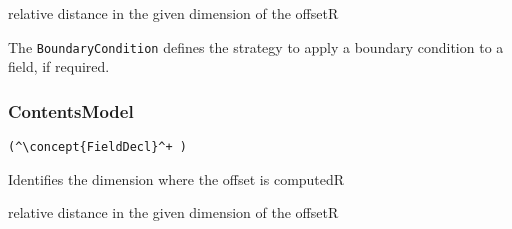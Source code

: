 \begin{HIRAttributes}
	{relative distance in the given dimension of the offset}{R}
\end{HIRAttributes}

The {\tt BoundaryCondition} defines the strategy to apply a boundary condition to a field, if required.

\subsubsection*{ContentsModel}{}

\begin{lstlisting}[style=default]
(^\concept{FieldDecl}^+ )
\end{lstlisting}

\begin{HIRChildElements}
	{Identifies the dimension where the offset is computed}{R}
\end{HIRChildElements}

\begin{HIRAttributes}
	{relative distance in the given dimension of the offset}{R}
\end{HIRAttributes}
